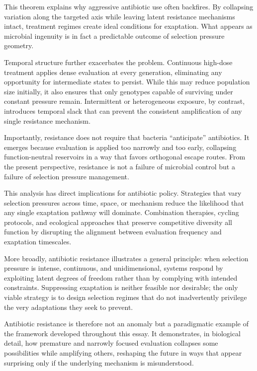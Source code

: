 \documentclass[11pt]{article}
\theoremstyle{definition}
\begin{document}
This theorem explains why aggressive antibiotic use often backfires. By collapsing variation along the targeted axis while leaving latent resistance mechanisms intact, treatment regimes create ideal conditions for exaptation. What appears as microbial ingenuity is in fact a predictable outcome of selection pressure geometry.

Temporal structure further exacerbates the problem. Continuous high-dose treatment applies dense evaluation at every generation, eliminating any opportunity for intermediate states to persist. While this may reduce population size initially, it also ensures that only genotypes capable of surviving under constant pressure remain. Intermittent or heterogeneous exposure, by contrast, introduces temporal slack that can prevent the consistent amplification of any single resistance mechanism.

Importantly, resistance does not require that bacteria ``anticipate'' antibiotics. It emerges because evaluation is applied too narrowly and too early, collapsing function-neutral reservoirs in a way that favors orthogonal escape routes. From the present perspective, resistance is not a failure of microbial control but a failure of selection pressure management.

This analysis has direct implications for antibiotic policy. Strategies that vary selection pressures across time, space, or mechanism reduce the likelihood that any single exaptation pathway will dominate. Combination therapies, cycling protocols, and ecological approaches that preserve competitive diversity all function by disrupting the alignment between evaluation frequency and exaptation timescales.

More broadly, antibiotic resistance illustrates a general principle: when selection pressure is intense, continuous, and unidimensional, systems respond by exploiting latent degrees of freedom rather than by complying with intended constraints. Suppressing exaptation is neither feasible nor desirable; the only viable strategy is to design selection regimes that do not inadvertently privilege the very adaptations they seek to prevent.

Antibiotic resistance is therefore not an anomaly but a paradigmatic example of the framework developed throughout this essay. It demonstrates, in biological detail, how premature and narrowly focused evaluation collapses some possibilities while amplifying others, reshaping the future in ways that appear surprising only if the underlying mechanism is misunderstood.
\end{document}
